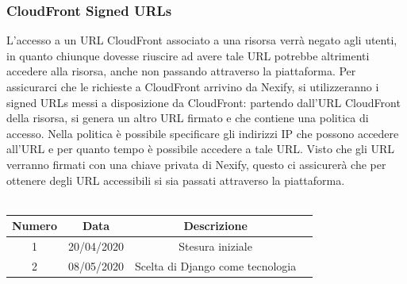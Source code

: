 \subsubsection{CloudFront Signed URLs}
L'accesso a un URL CloudFront associato a una risorsa verrà negato agli utenti, in quanto chiunque dovesse riuscire ad avere tale URL potrebbe altrimenti accedere alla risorsa, anche non passando attraverso la piattaforma. Per assicurarci che le richieste a CloudFront arrivino da Nexify, si utilizzeranno i signed URLs messi a disposizione da CloudFront: partendo dall'URL CloudFront della risorsa, si genera un altro URL firmato e che contiene una politica di accesso. Nella politica è possibile specificare gli indirizzi IP che possono accedere all'URL e per quanto tempo è possibile accedere a tale URL. Visto che gli URL verranno firmati con una chiave privata di Nexify, questo ci assicurerà che per ottenere degli URL accessibili si sia passati attraverso la piattaforma.
\newline\newline
{} \\ \\
\begin{tabular}{|c | c | c | c|} 
 	\hline
	 Numero & Data & Descrizione \\ [0.5ex] 
	\hline\hline
	1 & 20/04/2020 & Stesura iniziale \\ 
	\hline
	2 & 08/05/2020 & Scelta di Django come tecnologia \\
	\hline
\end{tabular}